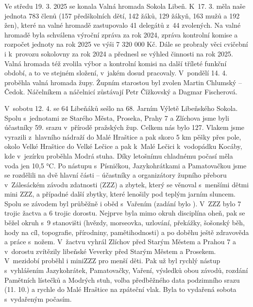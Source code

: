 \documentclass[11pt]{article}
\begin{document}
Ve středu 19. 3. 2025 se konala Valná hromada Sokola Libeň. K~17. 3.
měla naše jednota 783 členů (157 předškolních dětí, 142 žáků, 129 žákyň,
163 mužů a 192 žen), které na valné hromadě zastupovalo 41 delegátů z~44
zvolených. Na valné hromadě byla schválena výroční zpráva za rok 2024,
zpráva kontrolní komise a rozpočet jednoty na rok 2025 ve výši 7 320 000
Kč. Dále se probraly věci cvičební i k~provozu sokolovny za rok 2024 a
přednesl se výhled činnosti na rok 2025. Valná hromada též zvolila
výbor a kontrolní komisi na další tříleté funkční období, a to ve
stejném
složení, v~jakém dosud pracovaly.
V~pondělí 14. 4. proběhla valná hromada župy. Župním starostou
byl zvolen
Martin Chlumský -- Čedok. Náčelníkem a náčelnicí zůstávají Petr
Čížkovský a
Dagmar Fischerová.

V~sobotu 12. 4. se 64 Libeňáků sešlo na 68. Jarním Výletě Libeňského
Sokola. Spolu s~jednotami ze Starého Města, Proseka, Prahy 7 a Zlíchova
jsme byli účastníky 59. srazu v~přírodě pražských žup. Celkem nás bylo
127.
Vlakem jsme vyrazili z~hlavního nádraží do Malé Hraštice a pak skoro 5
km
pěšky přes pole, okolo Velké Hraštice do Velké Lečice a pak k~Malé
Lečici
k~vodopádku Kocáby, kde v~jezírku proběhla Modrá stuha. Díky letošnímu
chladnému počasí měla voda jen 10,5 °C. Po nástupu s~Písničkou,
Jazykohrátkami a Pamatovačkou jsme se rozdělili na dvě hlavní části --
účastníky a organizátory župního přeboru v~Zálesáckém závodu zdatnosti
(ZZZ) a zbytek, který se věnoval s~menšími dětmi mini ZZZ, a případné
další
zbytky, které lenošily pod teplým jarním sluncem. Spolu se závodem byl
průběžně i oběd s~Vařením (zadání bylo ). V~ZZZ bylo 7
trojic žactva
a 6 trojic dorostu. Nejprve byla mimo okruh disciplína oheň, pak se
běžel
okruh s~9 stanovišti (hvězdy, morseovka, uzlování, překážky, šošonský
běh,
hody na cíl, topografie, přírodniny, pamětihodnosti) a po doběhu ještě
zdravověda a práce s~nožem. V~žactvu vyhrál Zlíchov před Starým Městem a
Prahou 7 a v~dorostu zvítězily libeňské Veverky před Starým Městem a
Prosekem. V~mezidobí proběhl i miniZZZ pro menší děti. Pak už byl rychlý
nástup s~vyhlášením Jazykohrátek, Pamatovačky, Vaření, výsledků obou
závodů, rozdání Pamětních lístečků a Modrých stuh, volba předběžného
data
podzimního srazu (11. 10.) a rychle do Malé Hraštice na zpáteční vlak.
Byla to
vydařená sobota s~vydařeným počasím.
\end{document}
